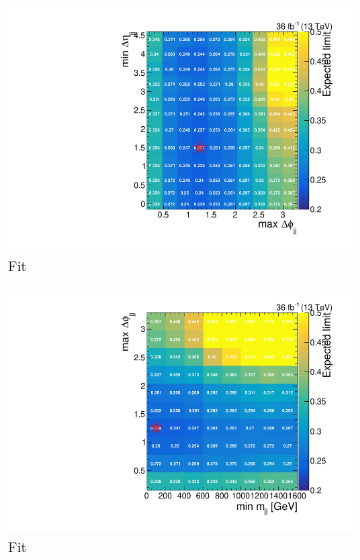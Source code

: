 \begin{figure}[]
    \begin{center}
        \begin{subfigure}[t]{0.32\textwidth}
            \includegraphics[width=\textwidth]{figures/vbf/opt/optimized_scan_deta_fabsdphi.pdf}
            \caption{Fit \mjj}
        \end{subfigure}
        \begin{subfigure}[t]{0.32\textwidth}
            \includegraphics[width=\textwidth]{figures/vbf/opt/optimized_scan_fabsdphi_mjj.pdf}
            \caption{Fit \deta}
        \end{subfigure}
        \begin{subfigure}[t]{0.32\textwidth}

\end{subfigure}
\end{center}
\end{figure}
